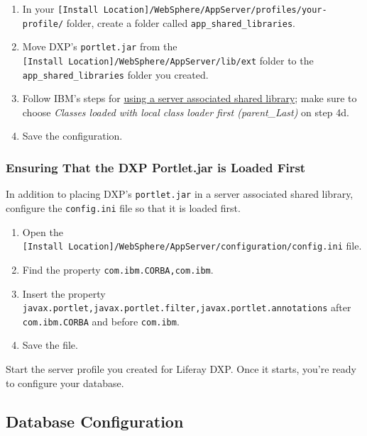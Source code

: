 \begin{enumerate}
\def\labelenumi{\arabic{enumi}.}
\item
  In your
  \texttt{{[}Install\ Location{]}/WebSphere/AppServer/profiles/your-profile/}
  folder, create a folder called \texttt{app\_shared\_libraries}.
\item
  Move DXP's \texttt{portlet.jar} from the
  \texttt{{[}Install\ Location{]}/WebSphere/AppServer/lib/ext} folder to
  the \texttt{app\_shared\_libraries} folder you created.
\item
  Follow IBM's steps for
  \href{https://www.ibm.com/support/pages/best-practice-using-common-application-files\#usingserver}{using
  a server associated shared library}; make sure to choose \emph{Classes
  loaded with local class loader first (parent\_Last)} on step 4d.
\item
  Save the configuration.
\end{enumerate}

\subsubsection{Ensuring That the DXP Portlet.jar is Loaded
First}\label{ensuring-that-the-dxp-portlet.jar-is-loaded-first}

In addition to placing DXP's \texttt{portlet.jar} in a server associated
shared library, configure the \texttt{config.ini} file so that it is
loaded first.

\begin{enumerate}
\def\labelenumi{\arabic{enumi}.}
\tightlist
\item
  Open the
  \texttt{{[}Install\ Location{]}/WebSphere/AppServer/configuration/config.ini}
  file.
\item
  Find the property \texttt{com.ibm.CORBA,com.ibm}.
\item
  Insert the property
  \texttt{javax.portlet,javax.portlet.filter,javax.portlet.annotations}
  after \texttt{com.ibm.CORBA} and before \texttt{com.ibm}.
\item
  Save the file.
\end{enumerate}

Start the server profile you created for Liferay DXP. Once it starts,
you're ready to configure your database.

\subsection{Database Configuration}\label{database-configuration-5}

